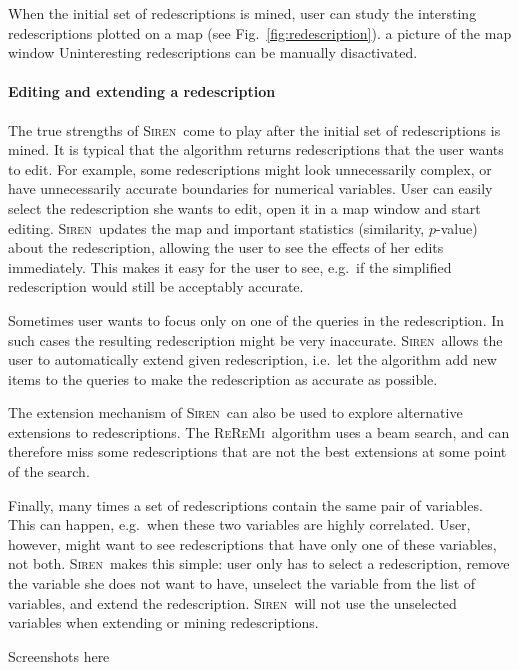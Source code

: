 \documentclass{sig-alternate}
\newcommand{\note}[1]{{\color{red}#1}}
\newcommand{\Siren}{\textsc{Siren}}
\newcommand{\ReReMi}{\textsc{ReReMi}}
\begin{document}
When the initial set of redescriptions is mined, user can study the
intersting redescriptions plotted on a map (see
Fig.~\ref{fig:redescription}). \note{a picture of the map window} 
Uninteresting redescriptions can be manually disactivated.

\paragraph{Editing and extending a redescription}
The true strengths of \Siren\ come to play after the initial set of
redescriptions is mined. It is typical that the algorithm returns
redescriptions that the user wants to edit. For example, some
redescriptions might look unnecessarily complex, or have unnecessarily
accurate boundaries for numerical variables. User can easily select
the redescription she wants to edit, open it in a map window and start
editing. \Siren\ updates the map and important statistics (similarity,
$p$-value) about the
redescription, allowing the user to see the effects of her edits
immediately. This makes it easy for the user to see, e.g.\ if
the simplified redescription would still be acceptably accurate.

Sometimes user wants to focus only on one of the queries in the
redescription. In such cases the resulting redescription might be very
inaccurate. \Siren\ allows the user to automatically extend given
redescription, i.e.\ let the algorithm add new items to the queries to
make the redescription as accurate as possible. 

The extension mechanism of \Siren\ can also be used to explore
alternative extensions to redescriptions. The \ReReMi\ algorithm uses
a beam search, and can therefore miss some redescriptions that are not
the best extensions at some point of the search. 

Finally, many times a set of redescriptions contain the same pair of
variables. This can happen, e.g.\ when these two variables are highly
correlated. User, however, might want to see redescriptions that have
only one of these variables, not both. \Siren\ makes this simple: user
only has to select a redescription, remove the variable she does not
want to have, unselect the variable from the list of variables, and
extend the redescription. \Siren\ will not use the unselected
variables when extending or mining redescriptions.

\note{Screenshots here}
\end{document}

